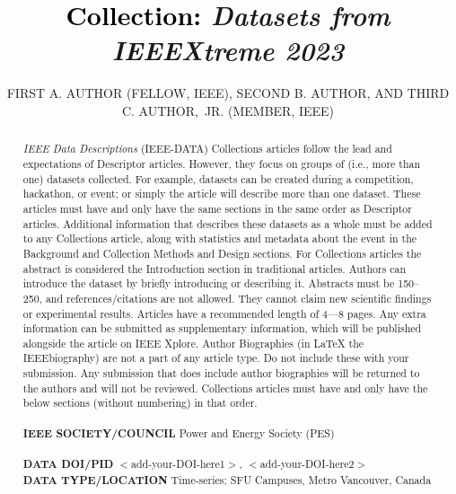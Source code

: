 \documentclass{IEEEoj-data}
\begin{document}

\title{\textcolor{black}{Collection:} \textcolor{ieeedata}{\textit{Datasets from IEEEXtreme 2023}}}

\author{FIRST A. AUTHOR (FELLOW, IEEE), SECOND B.
AUTHOR, AND THIRD C. AUTHOR,~JR.
(MEMBER, IEEE)}

\begin{abstract}
\textit{IEEE Data Descriptions} (IEEE-DATA) Collections articles follow the lead and expectations of Descriptor articles. However, they focus on groups of (i.e., more than one) datasets collected. For example, datasets can be created during a competition, hackathon, or event; or simply the article will describe more than one dataset. These articles must have and only have the same sections in the same order as Descriptor articles. Additional information that describes these datasets as a whole must be added to any Collections article, along with statistics and metadata about the event in the Background and Collection Methods and Design sections. For Collections articles the abstract is considered the Introduction section in traditional articles. Authors can introduce the dataset by briefly introducing or describing it. Abstracts must be 150--250, and references/citations are not allowed. They cannot claim new scientific findings or experimental results. Articles have a recommended length of 4—8 pages. Any extra information can be submitted as supplementary information, which will be published alongside the article on IEEE Xplore. Author Biographies (in LaTeX the IEEEbiography) are not a part of any article type. Do not include these with your submission. Any submission that does include author biographies will be returned to the authors and will not be reviewed. Collections articles must have and only have the below sections (without numbering) in that order.\\ 
 \\ 
 {\textcolor{ieeedata}{\abstractheadfont\bfseries{IEEE SOCIETY/COUNCIL}}}     Power and Energy Society (PES)\\  
 \\
 {\textcolor{ieeedata}{\abstractheadfont\bfseries{DATA DOI/PID}}}     $<$add-your-DOI-here1$>$,  $<$add-your-DOI-here2$>$\\ 
  
 {\textcolor{ieeedata}{\abstractheadfont\bfseries{DATA TYPE/LOCATION}}}  Time-series; SFU Campuses, Metro Vancouver, Canada

\end{abstract}
\end{document}
